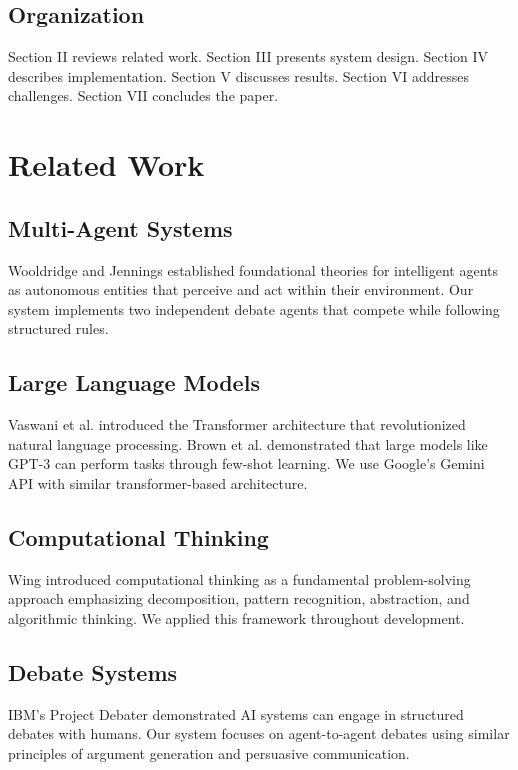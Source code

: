 \documentclass[conference]{IEEEtran}
\begin{document}
\subsection{Organization}

Section II reviews related work. Section III presents system design. Section IV describes implementation. Section V discusses results. Section VI addresses challenges. Section VII concludes the paper.

\section{Related Work}

\subsection{Multi-Agent Systems}

Wooldridge and Jennings \cite{wooldridge1995} established foundational theories for intelligent agents as autonomous entities that perceive and act within their environment. Our system implements two independent debate agents that compete while following structured rules.

\subsection{Large Language Models}

Vaswani et al. \cite{vaswani2017} introduced the Transformer architecture that revolutionized natural language processing. Brown et al. \cite{brown2020} demonstrated that large models like GPT-3 can perform tasks through few-shot learning. We use Google's Gemini API with similar transformer-based architecture.

\subsection{Computational Thinking}

Wing \cite{wing2006} introduced computational thinking as a fundamental problem-solving approach emphasizing decomposition, pattern recognition, abstraction, and algorithmic thinking. We applied this framework throughout development.

\subsection{Debate Systems}

IBM's Project Debater demonstrated AI systems can engage in structured debates with humans. Our system focuses on agent-to-agent debates using similar principles of argument generation and persuasive communication.
\end{document}
